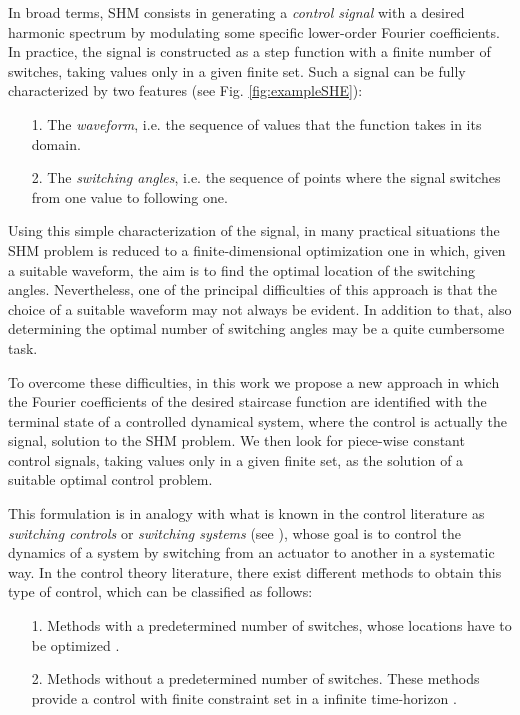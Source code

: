 \documentclass[twocolumn]{autart}    %
\begin{document}
In broad terms, SHM consists in generating a \textit{control signal} with a desired harmonic spectrum by modulating some specific lower-order Fourier coefficients. In practice, the signal is constructed as a step function with a finite number of switches, taking values only in a given finite set. Such a signal can be fully characterized by two features (see Fig. \ref{fig:exampleSHE}): 
\begin{itemize}
	\item[1.] The \textit{waveform}, i.e. the sequence of values that the function takes in its domain.
	\item[2.] The \textit{switching angles}, i.e. the sequence of points where the signal switches from one value to following one. 
\end{itemize}

Using this simple characterization of the signal, in many practical situations the SHM problem is reduced to a finite-dimensional optimization one in which, given a suitable waveform, the aim is to find the optimal location of the switching angles. Nevertheless, one of the principal difficulties of this approach is that the choice of a suitable waveform may not always be evident. In addition to that, also determining the optimal number of switching angles may be a quite cumbersome task. 
 
To overcome these difficulties, in this work we propose a new approach in which the Fourier coefficients of the desired staircase function are identified with the terminal state of a controlled dynamical system, where the control is actually the signal, solution to the SHM problem. We then look for piece-wise constant control signals, taking values only in a given finite set, as the solution of a suitable optimal control problem. 

This formulation is in analogy with what is known in the control literature as \textit{switching controls} or \textit{switching systems} (see \cite{liberzon2003switching,Zuazua2011, liu2014optimal}), whose goal is to control the dynamics of a system by switching from an actuator to another in a systematic way. In the control theory literature, there exist different methods to obtain this type of control, which can be classified as follows:
\begin{enumerate}
	\item [1.] Methods with a predetermined number of switches, whose locations have to be optimized \cite{Xu2002}.
	\item [2.] Methods without a predetermined number of switches. These methods provide a control with finite constraint set in a infinite time-horizon \cite{Quevedo2004}.
\end{enumerate} 
\end{document}
